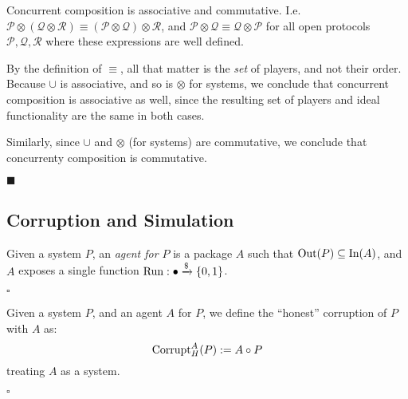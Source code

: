 \begin{lemma}
Concurrent composition is associative and commutative.
I.e. $\mathcal{P} \otimes (\mathcal{Q} \otimes \mathcal{R}) \equiv (\mathcal{P} \otimes \mathcal{Q}) \otimes \mathcal{R}$,
and $\mathcal{P} \otimes \mathcal{Q} \equiv \mathcal{Q} \otimes \mathcal{P}$ for
all open protocols $\mathcal{P}, \mathcal{Q}, \mathcal{R}$ where these expressions
are well defined.


By the definition of $\equiv$, all that matter is the \emph{set} of players,
and not their order.
Because $\cup$ is associative, and so is $\otimes$ for systems,
we conclude that concurrent composition is associative as well,
since the resulting set of players and ideal functionality are the same
in both cases.

Similarly, since $\cup$ and $\otimes$ (for systems) are commutative,
we conclude that concurrenty composition is commutative.

$\blacksquare$
\end{lemma}

\subsection{Corruption and Simulation}

\begin{definition}
Given a system $P$, an \emph{agent for $P$} is a package $A$ such that
$\text{Out}(P) \subseteq \text{In}(A)$, and $A$ exposes a single function
$\text{Run} : \bullet \xrightarrow{\$} \{0, 1\}$.

$\square$
\end{definition}

\begin{definition}
Given a system $P$, and an agent $A$ for $P$,
we define the ``honest'' corruption of $P$ with $A$ as:
$$
\text{Corrupt}_H^A(P) := A \circ P
$$
treating $A$ as a system.

$\square$
\end{definition}
